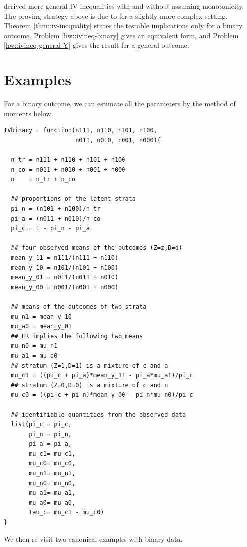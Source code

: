 \citet{balke1997bounds} derived more general IV inequalities with and without assuming monotonicity. The proving strategy above is due to  \citet{jiang2020measurement} for a slightly more complex setting. Theorem \ref{thm::iv-inequality} states the testable implications only for a binary outcome. Problem \ref{hw::ivineq-binary} gives an equivalent form, and Problem \ref{hw::ivineq-general-Y} gives the result for a general outcome.



\section{Examples}\label{section::binary-y-ivineq}


For a binary outcome, we can estimate all the parameters by the method of moments below.


\begin{lstlisting}
IVbinary = function(n111, n110, n101, n100, 
                    n011, n010, n001, n000){
  
  n_tr = n111 + n110 + n101 + n100
  n_co = n011 + n010 + n001 + n000
  n    = n_tr + n_co
  
  ## proportions of the latent strata
  pi_n = (n101 + n100)/n_tr
  pi_a = (n011 + n010)/n_co
  pi_c = 1 - pi_n - pi_a
  
  ## four observed means of the outcomes (Z=z,D=d)
  mean_y_11 = n111/(n111 + n110)
  mean_y_10 = n101/(n101 + n100)
  mean_y_01 = n011/(n011 + n010)
  mean_y_00 = n001/(n001 + n000)
  
  ## means of the outcomes of two strata
  mu_n1 = mean_y_10
  mu_a0 = mean_y_01
  ## ER implies the following two means
  mu_n0 = mu_n1
  mu_a1 = mu_a0
  ## stratum (Z=1,D=1) is a mixture of c and a
  mu_c1 = ((pi_c + pi_a)*mean_y_11 - pi_a*mu_a1)/pi_c
  ## stratum (Z=0,D=0) is a mixture of c and n
  mu_c0 = ((pi_c + pi_n)*mean_y_00 - pi_n*mu_n0)/pi_c
  
  ## identifiable quantities from the observed data
  list(pi_c = pi_c, 
       pi_n = pi_n, 
       pi_a = pi_a, 
       mu_c1= mu_c1,
       mu_c0= mu_c0,
       mu_n1= mu_n1,
       mu_n0= mu_n0,
       mu_a1= mu_a1,
       mu_a0= mu_a0,
       tau_c= mu_c1 - mu_c0)
}
\end{lstlisting}


We then re-visit two canonical examples with binary data. 

